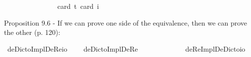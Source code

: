 \begin{isabellebody}
\isamarkupfalse%
\ {\isachardoublequoteopen}{\isasymlfloor}\isactrlbold {\isasymforall}{\isasymalpha}{\isachardot}\ {\isacharparenleft}{\isacharparenleft}{\isasymlambda}{\isasymbeta}{\isachardot}\ \isactrlbold {\isasymbox}{\isacharparenleft}{\isasymalpha}\ {\isasymbeta}{\isacharparenright}{\isacharparenright}\ \isactrlbold {\isasymdown}{\isacharparenleft}{\isasymtau}{\isacharcolon}{\isacharcolon}{\isasymup}{\isasymlangle}{\isasymzero}{\isasymrangle}{\isacharparenright}{\isacharparenright}\ \isactrlbold {\isasymleftrightarrow}\ \isactrlbold {\isasymbox}{\isacharparenleft}\ {\isacharparenleft}{\isasymlambda}{\isasymbeta}{\isachardot}\ {\isacharparenleft}{\isasymalpha}\ {\isasymbeta}{\isacharparenright}{\isacharparenright}\ \isactrlbold {\isasymdown}{\isasymtau}{\isacharparenright}{\isasymrfloor}{\isachardoublequoteclose}\ \isanewline
\ \ \isamarkupfalse%
{\isacharbrackleft}card\ {\isacharprime}t{\isacharequal}{}{\isacharcomma}\ card\ i{\isacharequal}{}{\isacharbrackright}%
\isadelimproof
\ %
\endisadelimproof
%
\isatagproof
{}\isamarkupfalse%
\ %
%
\endisatagproof
{\isafoldproof}%
%
\isadelimproof
%
\endisadelimproof
%
\begin{isamarkuptext}%
Proposition 9.6 - If we can prove one side of the equivalence, then we can prove the other (p. 120):%
\end{isamarkuptext}\isamarkuptrue%
\isamarkupfalse%
\ deDictoImplDeRe{\isacharcolon}{\isacharcolon}{\isachardoublequoteopen}{\isasymup}{\isasymzero}{\isasymRightarrow}io{\isachardoublequoteclose}\ \isanewline
\ \ \ {\isachardoublequoteopen}deDictoImplDeRe\ {\isasymtau}\ {\isasymequiv}\ \isactrlbold {\isasymforall}{\isasymalpha}{\isachardot}\ \isactrlbold {\isasymbox}{\isacharparenleft}{\isacharparenleft}{\isasymlambda}{\isasymbeta}{\isachardot}\ {\isacharparenleft}{\isasymalpha}\ {\isasymbeta}{\isacharparenright}{\isacharparenright}\ \isactrlbold {\isasymdownharpoonleft}{\isasymtau}{\isacharparenright}\ \isactrlbold {\isasymrightarrow}\ {\isacharparenleft}{\isacharparenleft}{\isasymlambda}{\isasymbeta}{\isachardot}\ \isactrlbold {\isasymbox}{\isacharparenleft}{\isasymalpha}\ {\isasymbeta}{\isacharparenright}{\isacharparenright}\ \isactrlbold {\isasymdownharpoonleft}{\isasymtau}{\isacharparenright}{\isachardoublequoteclose}\isanewline
{}\isamarkupfalse%
\ deReImplDeDicto{\isacharcolon}{\isacharcolon}{\isachardoublequoteopen}{\isasymup}{\isasymzero}{\isasymRightarrow}io{\isachardoublequoteclose}\ \isanewline

\end{isabellebody}

